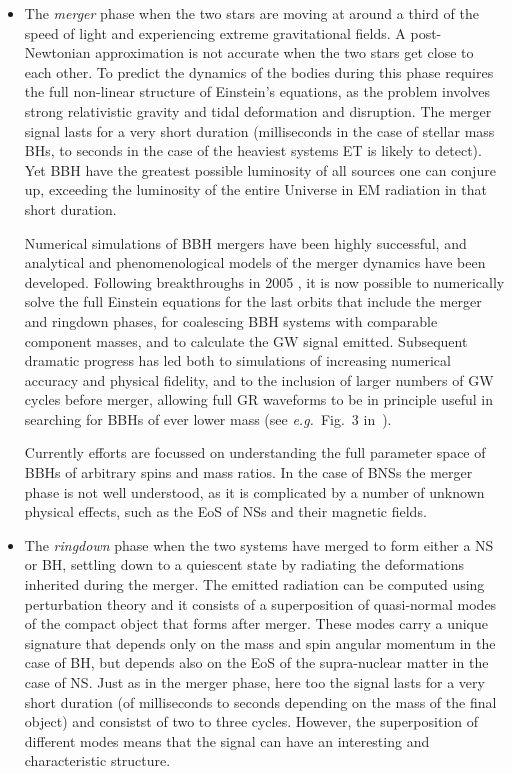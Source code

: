 \begin{itemize}
\item The \emph{merger} phase when the two stars are moving at around
a third of the speed of light and experiencing extreme gravitational fields.
A post-Newtonian approximation is not accurate when the two stars get close to
each other. To predict the dynamics of the bodies during this
phase requires the full non-linear structure of Einstein's equations,
as the problem involves strong relativistic gravity and tidal deformation
and disruption.  The merger signal lasts for a very short duration (milliseconds
in the case of stellar mass BHs, to seconds in the case of the
heaviest systems ET is likely to detect). Yet BBH have the greatest 
possible luminosity of all sources one can conjure up, exceeding the 
luminosity of the entire Universe in EM radiation in that short duration.

Numerical simulations of BBH mergers have been highly successful, and 
analytical and phenomenological models of the merger dynamics have been developed. 
Following breakthroughs in 2005 \cite{Pretorius05,Campanelli:2005dd,Baker:2005vv},
it is now possible to numerically solve the full Einstein equations for the 
last orbits that include the merger and ringdown phases, for coalescing BBH
systems with comparable component masses, and to calculate the
GW signal emitted. Subsequent dramatic progress has led both to
simulations of increasing numerical accuracy and physical
fidelity, and to the inclusion of larger numbers of GW cycles before
merger, allowing full GR waveforms to be in principle useful in searching for
BBHs of ever lower mass (see \emph{e.g.}\ Fig.~3 in~\cite{Hannam:2009rd}).

Currently efforts are focussed 
on understanding the full parameter space of BBHs
of arbitrary spins and mass ratios.  In the case of BNSs the 
merger phase is not well understood, as it is complicated by a number of unknown
physical effects, such as the EoS of NSs and their magnetic fields.

 \item The \emph{ringdown} phase when the
two systems have merged to form either a NS or BH, settling down to a
quiescent state by radiating the deformations inherited during the merger.
The emitted radiation can be computed using perturbation theory and
it consists of a superposition of quasi-normal modes of the compact object
that forms after merger. These modes carry a unique signature that depends
only on the mass and spin angular momentum in the case of BH, but depends 
also on the EoS of the supra-nuclear matter in the case of NS. Just as in the
merger phase, here too the signal lasts for a very short duration (of 
milliseconds to seconds depending on the mass of the final object) and 
consistst of two to three cycles. However, the superposition of different modes 
means that the signal can have an interesting and characteristic structure.
\end{itemize}


